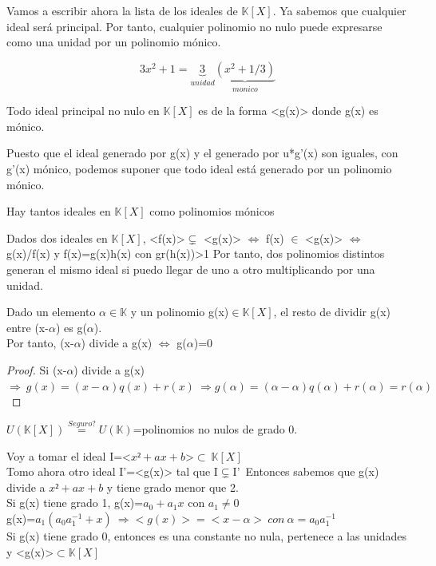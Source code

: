 \documentclass[nochap]{apuntes}
\begin{document}
Vamos a escribir ahora la lista de los ideales de $\mathbb{K}[X]$. Ya sabemos que cualquier ideal será principal. Por tanto, cualquier polinomio no nulo puede expresarse como una unidad por un polinomio mónico.\\
\begin{example}
 \[3x^{2}+1=\underbrace{3}_{unidad}\underbrace{(x^{2}+1/3)}_{monico}\]
\end{example}

\begin{lemma}
 Todo ideal principal no nulo en $\mathbb{K}[X]$  es de la forma <g(x)> donde g(x) es mónico.
\end{lemma}
Puesto que el ideal generado por g(x) y el generado por u*g'(x) son iguales, con g'(x) mónico, podemos suponer que todo ideal
está generado por un polinomio mónico.\\
\begin{corol}
 Hay tantos ideales en $\mathbb{K}[X]$  como polinomios mónicos
\end{corol}

\obs Dados dos ideales en $\mathbb{K}[X]$, <f(x)>$\varsubsetneq$  <g(x)> $\Leftrightarrow$  f(x) $\in$  <g(x)> $\Leftrightarrow$  g(x)/f(x) y f(x)=g(x)h(x) con gr(h(x))>1
Por tanto, dos polinomios distintos generan el mismo ideal si puedo llegar de uno a otro multiplicando por una unidad.
\begin{theorem}
Dado un elemento $\alpha \in \mathbb{K}$  y un polinomio g(x)$\in \mathbb{K}[X]$, el resto de dividir g(x) entre (x-$\alpha$) es g($\alpha$).\\
Por tanto, (x-$\alpha$) divide a g(x) $\Leftrightarrow$  g($\alpha$)=0
\end{theorem}
\begin{proof}
 Si (x-$\alpha$) divide a g(x) $\Rightarrow \ g(x)=(x-\alpha)q(x)+r(x) \ \Rightarrow g(\alpha)=(\alpha-\alpha)q(\alpha)+r(\alpha)=r(\alpha)$
\end{proof}

\obs $U(\mathbb{K}[X]) \stackrel{Seguro?}{=}U(\mathbb{K})$=polinomios no nulos de grado 0.

\begin{example}
 Voy a tomar el ideal I=<$x²+ax+b$>$\subset \ \mathbb{K}[X]$\\
 
 Tomo ahora otro ideal I'=<g(x)> tal que I$\varsubsetneq$I'\
 Entonces sabemos que g(x) divide a $x²+ax+b$  y tiene grado menor que 2.\\
 Si g(x) tiene grado 1, g(x)=$a_0+a_1 x$  con $a_1\neq 0$\\
 g(x)=$a_1(a_0a_1^{-1}+x) \ \Rightarrow <g(x)>=<x-\alpha> \ con \ \alpha=a_0a_1^{-1}$\\
 
 Si g(x) tiene grado 0, entonces es una constante no nula, pertenece a las unidades y <g(x)>$\subset \mathbb{K}[X]$\\
\end{example}
\end{document}
